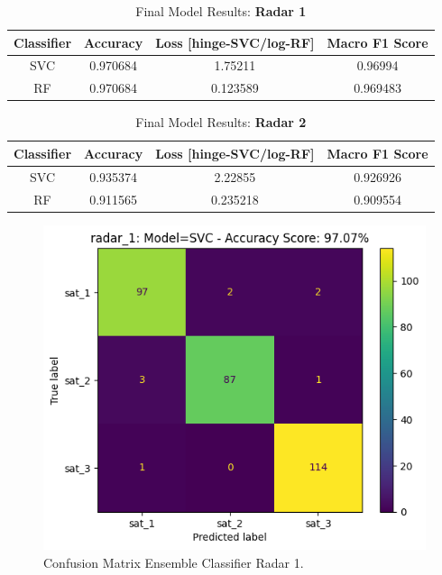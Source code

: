 \documentclass[./report_entry.tex]{subfiles}
\begin{document}
            \begin{table}[htbp]
            \centering
            \caption{Final Model Results: \textbf{Radar 1}}
            \begin{tabular}{cccc}
                \hline
                Classifier & Accuracy & Loss [hinge-SVC/log-RF] & Macro F1 Score \\ \hline
                SVC & 0.970684 & 1.75211 & 0.96994 \\
                RF & 0.970684 & 0.123589 & 0.969483 \\ \hline
                \end{tabular}
                \label{final_radar_1}
            \end{table}

            \begin{table}[htbp]
                \centering
                \caption{Final Model Results: \textbf{Radar 2}}
                \begin{tabular}{cccc}
                    \hline
                    Classifier & Accuracy & Loss [hinge-SVC/log-RF] & Macro F1 Score \\ \hline
                    SVC & 0.935374 & 2.22855 & 0.926926 \\
                    RF & 0.911565 & 0.235218 & 0.909554 \\ \hline
                    \end{tabular}
                    \label{final_radar_2}
            \end{table}

            \begin{figure}[!htbp]
                \centering
                \includegraphics[scale=0.80]{../graphics/CM_radar1.png}
                \caption{Confusion Matrix Ensemble Classifier Radar 1.}
                \label{cm1}
            \end{figure}
\end{document}
